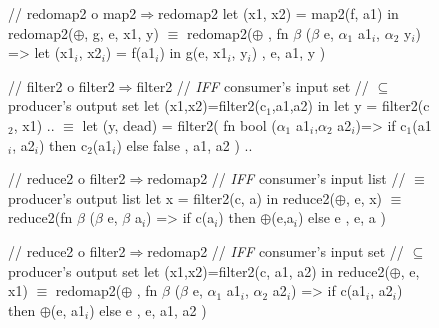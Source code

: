 \documentclass{sigplanconf}  %
\newcommand{\emp}[1]{\textcolor{DikuRed}{ #1}}
\newcommand{\emphh}[1]{\textcolor{CosGreen}{ #1}}
\newcommand{\mymath}[1]{$ #1 $}
\newcommand{\myindx}[1]{_{#1}}
\begin{document}
\begin{figure}[bt]
{\begin{minipage}{0.48\columnwidth}
\begin{colorcode}
//\emp{redomap2 o map2\mymath{\Rightarrow}redomap2}
let (x1, x2) = map2(f, a1)
in  redomap2(\mymath{\oplus}, g, e, x1, y)
    \emphh{\mymath{\equiv}}
redomap2(\mymath{\oplus}
, fn \mymath{\beta} (\mymath{\beta} e, \mymath{\alpha\myindx{1}} a1\mymath{\myindx{i}}, \mymath{\alpha\myindx{2}} y\mymath{\myindx{i}})
   => let (x1\mymath{\myindx{i}}, x2\mymath{\myindx{i}}) = f(a1\mymath{\myindx{i}})
      in  g(e, x1\mymath{\myindx{i}}, y\mymath{\myindx{i}})
, e, a1, y )
\end{colorcode}
\end{minipage}
\hfill
\begin{minipage}{0.48\columnwidth}
\begin{colorcode}
//\emp{filter2 o filter2\mymath{\Rightarrow}filter2}
//\emp{{\em{}IFF} consumer's input set}
//\emp{  \mymath{\subseteq} producer's output set}
let (x1,x2)=filter2(c\mymath{\myindx{1}},a1,a2)
in  let y = filter2(c\mymath{\myindx{2}}, x1) ..
    \emphh{\mymath{\equiv}}
let (y, dead) = filter2(
  fn bool (\mymath{\alpha\myindx{1}} a1\mymath{\myindx{i}},\mymath{\alpha\myindx{2}} a2\mymath{\myindx{i}})=> 
      if   c\mymath{\myindx{1}}(a1\mymath{\myindx{i}}, a2\mymath{\myindx{i}}) 
      then c\mymath{\myindx{2}}(a1\mymath{\myindx{i}}) 
      else false 
, a1, a2 ) ..

//\emp{reduce2 o filter2\mymath{\Rightarrow}redomap2}
//\emp{{\em{}IFF} consumer's input list}
//\emp{  \mymath{\equiv} producer's output list}
let x = filter2(c, a)
in  reduce2(\mymath{\oplus}, e, x)
    \emphh{\mymath{\equiv}}
reduce2(fn \mymath{\beta} (\mymath{\beta} e, \mymath{\beta} a\mymath{\myindx{i}}) =>
  if c(a\mymath{\myindx{i}}) then \mymath{\oplus}(e,a\mymath{\myindx{i}}) else e
, e, a )

//\emp{reduce2 o filter2\mymath{\Rightarrow}redomap2}
//\emp{{\em{}IFF} consumer's input set}
//\emp{  \mymath{\subseteq} producer's output set}
let (x1,x2)=filter2(c, a1, a2)
in  reduce2(\mymath{\oplus}, e, x1)
    \emphh{\mymath{\equiv}}
redomap2(\mymath{\oplus}
, fn \mymath{\beta} (\mymath{\beta} e, \mymath{\alpha\myindx{1}} a1\mymath{\myindx{i}}, \mymath{\alpha\myindx{2}} a2\mymath{\myindx{i}})
   => if c(a1\mymath{\myindx{i}}, a2\mymath{\myindx{i}})
      then \mymath{\oplus}(e, a1\mymath{\myindx{i}}) else e
, e, a1, a2 )


\end{colorcode}
\end{minipage}}
\end{figure}
\end{document}
